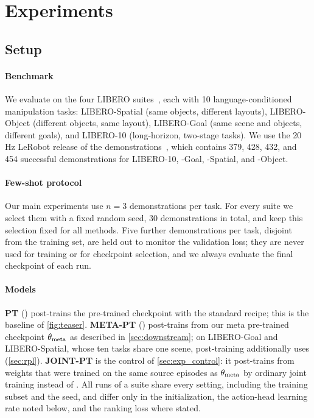 \section{Experiments}
\label{sec:exp}

\subsection{Setup}
\label{sec:setup}

\paragraph{Benchmark}
We evaluate on the four LIBERO suites~\cite{liu2023libero}, each with 10 language-conditioned manipulation tasks: LIBERO-Spatial (same objects, different layouts), LIBERO-Object (different objects, same layout), LIBERO-Goal (same scene and objects, different goals), and LIBERO-10 (long-horizon, two-stage tasks).
We use the 20\,Hz LeRobot release of the demonstrations~\cite{cadene2024lerobot}, which contains 379, 428, 432, and 454 successful demonstrations for LIBERO-10, -Goal, -Spatial, and -Object.

\paragraph{Few-shot protocol}
Our main experiments use $n{=}3$ demonstrations per task.
For every suite we select them with a fixed random seed, 30 demonstrations in total, and keep this selection fixed for all methods.
Five further demonstrations per task, disjoint from the training set, are held out to monitor the validation loss; they are never used for training or for checkpoint selection, and we always evaluate the final checkpoint of each run.

\paragraph{Models}
\textbf{PT} (\basept) post-trains the pre-trained \base checkpoint with the standard recipe; this is the baseline of \cref{fig:teaser}.
\textbf{META-PT} (\metapt) post-trains from our meta pre-trained checkpoint $\theta_{\mathrm{meta}}$ as described in \cref{sec:downstream}; on LIBERO-Goal and LIBERO-Spatial, whose ten tasks share one scene, post-training additionally uses \RPL (\cref{sec:rpl}).
\textbf{JOINT-PT} is the control of \cref{sec:exp_control}: it post-trains from weights that were trained on the same source episodes as $\theta_{\mathrm{meta}}$ by ordinary joint training instead of \method.
All runs of a suite share every setting, including the training subset and the seed, and differ only in the initialization, the action-head learning rate noted below, and the ranking loss where stated.

